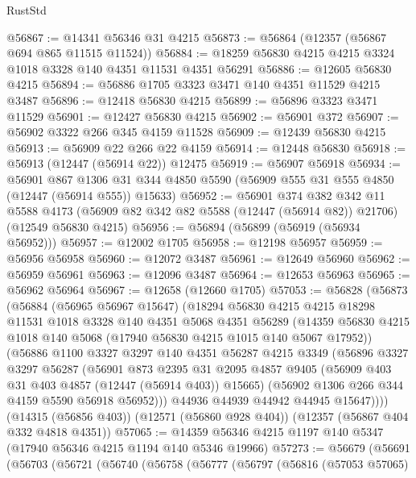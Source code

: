 \begin{lexlean}{RustStd}
\begin{coremodule}
@56867 := @14341 @56346 @31 @4215
@56873 := @56864 (@12357 (@56867 @694 @865 @11515 @11524))
@56884 := @18259 @56830 @4215 @4215 @3324 @1018 @3328 @140 @4351 @11531 @4351 @56291
@56886 := @12605 @56830 @4215
@56894 := @56886 @1705 @3323 @3471 @140 @4351 @11529 @4215 @3487
@56896 := @12418 @56830 @4215
@56899 := @56896 @3323 @3471 @11529
@56901 := @12427 @56830 @4215
@56902 := @56901 @372
@56907 := @56902 @3322 @266 @345 @4159 @11528
@56909 := @12439 @56830 @4215
@56913 := @56909 @22 @266 @22 @4159
@56914 := @12448 @56830
@56918 := @56913 (@12447 (@56914 @22)) @12475
@56919 := @56907 @56918
@56934 := @56901
    @867
    @1306
    @31
    @344
    @4850
    @5590
    (@56909 @555 @31 @555 @4850 (@12447 (@56914 @555)) @15633)
@56952 := @56901
    @374
    @382
    @342
    @11
    @5588
    @4173
    (@56909 @82 @342 @82 @5588 (@12447 (@56914 @82)) @21706)
    (@12549 @56830 @4215)
@56956 := @56894 (@56899 (@56919 (@56934 @56952)))
@56957 := @12002 @1705
@56958 := @12198 @56957
@56959 := @56956 @56958
@56960 := @12072 @3487
@56961 := @12649 @56960
@56962 := @56959 @56961
@56963 := @12096 @3487
@56964 := @12653 @56963
@56965 := @56962 @56964
@56967 := @12658 (@12660 @1705)
@57053 := @56828
    (@56873
      (@56884
        (@56965 @56967 @15647)
        (@18294
          @56830
          @4215
          @4215
          @18298
          @11531
          @1018
          @3328
          @140
          @4351
          @5068
          @4351
          @56289
          (@14359 @56830 @4215 @1018 @140 @5068 (@17940 @56830 @4215 @1015 @140 @5067 @17952))
          (@56886
            @1100
            @3327
            @3297
            @140
            @4351
            @56287
            @4215
            @3349
            (@56896
              @3327
              @3297
              @56287
              (@56901
                @873
                @2395
                @31
                @2095
                @4857
                @9405
                (@56909 @403 @31 @403 @4857 (@12447 (@56914 @403)) @15665)
                (@56902 @1306 @266 @344 @4159 @5590 @56918 @56952)))
            @44936
            @44939
            @44942
            @44945
            @15647))))
    (@14315 (@56856 @403))
    (@12571 (@56860 @928 @404))
    (@12357 (@56867 @404 @332 @4818 @4351))
@57065 := @14359 @56346 @4215 @1197 @140 @5347 (@17940 @56346 @4215 @1194 @140 @5346 @19966)
@57273 := @56679
    (@56691
      (@56703
        (@56721
          (@56740
            (@56758
              (@56777
                (@56797
                  (@56816
                    (@57053 @57065)

\end{coremodule}
\end{lexlean}
